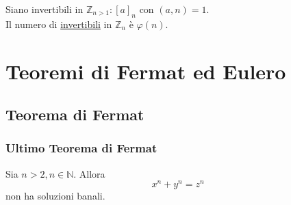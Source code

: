 \documentclass[a4paper,12pt, oneside]{book}
\begin{document}
		\begin{osservazione}
			Siano invertibili in $\mathbb{Z}_{n>1}: [a]_n$ con $(a,n)=1$.\\
			Il numero di \underline{invertibili} in $\mathbb{Z}_n$ è $\varphi(n)$.
		\end{osservazione}
	


\chapter{Teoremi di Fermat ed Eulero}
	\section{Teorema di Fermat}
		\subsection{Ultimo Teorema di Fermat}
			\begin{teorema}
				Sia $n > 2, n \in \mathbb{N}$. Allora $$x^n + y^n = z^n$$ non ha soluzioni banali.
			\end{teorema}
\end{document}
